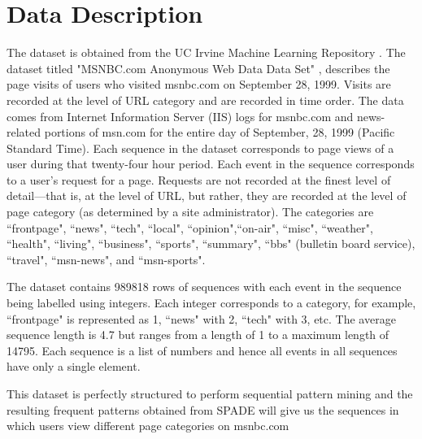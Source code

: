 \section{Data Description}

The dataset is obtained from the UC Irvine Machine Learning Repository \cite{b2}. The dataset titled "MSNBC.com Anonymous Web Data Data Set" \cite{b2}, describes the page visits of users who visited msnbc.com on September 28, 1999. Visits are recorded at the level of URL category and are recorded in time order. The data comes from Internet Information Server (IIS) logs for msnbc.com and news-related portions of msn.com for the entire day of September, 28, 1999 (Pacific Standard Time). Each sequence in the dataset corresponds to page views of a user during that twenty-four hour period. Each event in the sequence corresponds to a user's request for a page. Requests are not recorded at the finest level of detail---that is, at the level of URL, but rather, they are recorded at the level of page category (as determined by a site administrator). The categories are ``frontpage", ``news", ``tech", ``local", ``opinion",``on-air", ``misc", ``weather", ``health", ``living", ``business", ``sports", ``summary", ``bbs" (bulletin board service), ``travel", ``msn-news", and ``msn-sports".

The dataset contains 989818 rows of sequences with each event in the sequence being labelled using integers. Each integer corresponds to a category, for example, ``frontpage" is represented as 1, ``news" with 2, ``tech" with 3, etc. The average sequence length is 4.7 but ranges from a length of 1 to a maximum length of 14795. Each sequence is a list of numbers and hence all events in all sequences have only a single element.

This dataset is perfectly structured to perform sequential pattern mining and the resulting frequent patterns obtained from SPADE will give us the sequences in which users view different page categories on msnbc.com